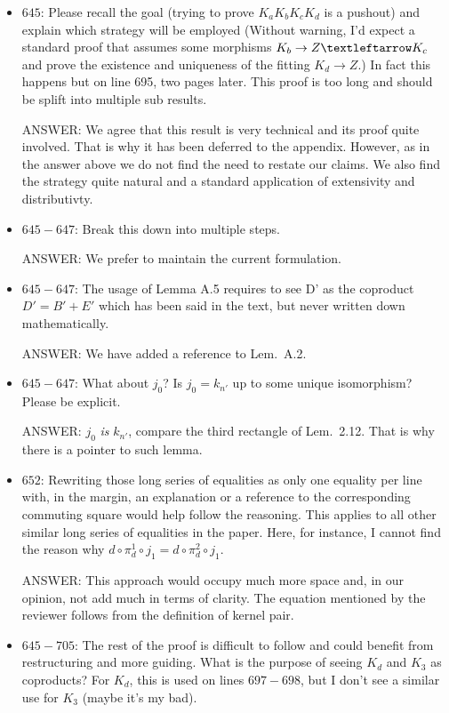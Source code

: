 \documentclass[english,11pt,a4paper]{article}
\begin{document}
\begin{itemize}
\item $645$: Please recall the goal (trying to prove $K_aK_bK_cK_d$ is a pushout) and explain which strategy will be employed (Without warning, I'd expect a standard proof that assumes some morphisms $K_b \to Z \textleftarrow K_c$ and prove the existence and uniqueness of the fitting $K_d \to Z$.) In fact this happens but on line 695, two pages later. This proof is too long and should be splift into multiple sub results.

ANSWER: We agree that this result is very technical and its proof quite involved. That is why it has been deferred to the appendix. However, as in the answer above we do not find the need to restate our claims. We also find the strategy quite natural and a standard application of extensivity and distributivty.

\item $645-647$: Break this down into multiple steps.

ANSWER: We prefer to maintain the current formulation.

\item $645-647$: The usage of Lemma A.5 requires to see D' as the coproduct $D' = B' + E'$ which has been said in the text, but never written down mathematically.

ANSWER: We have added a reference to Lem.~A.2.

\item $645-647$: What about $j_0$? Is $j_0 = k_{n'}$ up to some unique isomorphism? Please be explicit.

ANSWER: $j_0$ \emph{is} $k_{n'}$, compare the third rectangle of Lem.~2.12. That is why there is a pointer to such lemma.

\item $652$: Rewriting those long series of equalities as only one equality per line with, in the margin, an explanation or a reference to the corresponding commuting square would help follow the reasoning. This applies to all other similar long series of equalities in the paper. Here, for instance, I cannot find the reason why $d \circ \pi^1_d \circ j_1 = d \circ \pi^2_d \circ j_1$.

ANSWER: This approach would occupy much more space and, in our opinion, not add much in terms of clarity. The equation mentioned by the reviewer follows from the definition of kernel pair. 


\item $645-705$: The rest of the proof is difficult to follow and could benefit from restructuring and more guiding. What is the purpose of seeing $K_d$ and $K_3$ as coproducts? For $K_d$, this is used on lines $697-698$, but I don't see a similar use for $K_3$ (maybe it's my bad).


\end{itemize}
\end{document}
